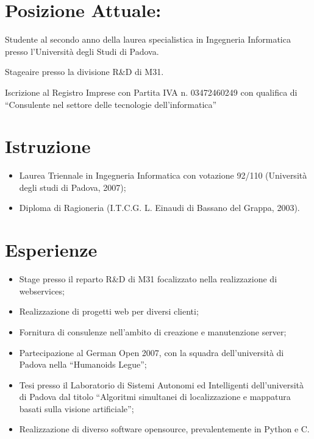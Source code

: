\documentclass[pdftex, a4paper, 11pt]{article}
\begin{document}
\section*{Posizione Attuale:}

\hspace{0.58cm}Studente al secondo anno della laurea specialistica in Ingegneria
Informatica presso l'Universit\`a degli Studi di Padova. 

Stageaire presso la divisione R\&D di M31.

Iscrizione al Registro Imprese con Partita IVA
n. 03472460249 con qualifica di ``Consulente nel settore delle
tecnologie dell'informatica''


\section*{Istruzione}
\begin{itemize}
\item Laurea Triennale in Ingegneria Informatica con votazione 92/110 (Universit\`a degli
  studi di Padova, 2007);
\item Diploma di Ragioneria (I.T.C.G. L. Einaudi di Bassano del Grappa,
  2003).
\end{itemize}

\section*{Esperienze}
\begin{itemize}
\item Stage presso il reparto R\&D di M31 focalizzato nella realizzazione di 
  webservices;
\item Realizzazione di progetti web per diversi clienti;
\item Fornitura di consulenze nell'ambito di creazione e manutenzione server;
\item Partecipazione al German Open 2007, con la squadra
  dell'universit\`a di Padova nella ``Humanoids Legue'';
\item Tesi presso il Laboratorio di Sistemi Autonomi ed
  Intelligenti dell'universit\`a di Padova dal titolo ``Algoritmi
  simultanei di localizzazione e mappatura basati sulla visione artificiale'';
\item Realizzazione di diverso software opensource,
  prevalentemente in Python e C.
\end{itemize}
\end{document}
